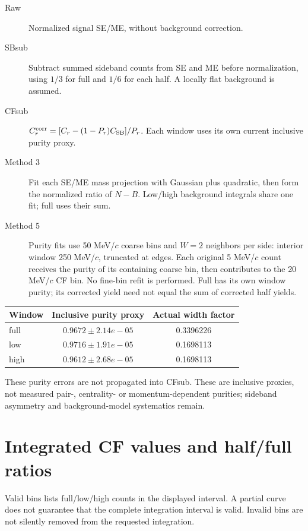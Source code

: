 \documentclass[10pt,a4paper]{article}
\begin{document}
\begin{description}
\item[Raw] Normalized signal SE/ME, without background correction.
\item[SBsub] Subtract summed sideband counts from SE and ME before normalization, using $1/3$ for full and $1/6$ for each half. A locally flat background is assumed.
\item[CFsub] $C_r^{\rm corr}=[C_r-(1-P_r)C_{\rm SB}]/P_r$. Each window uses its own current inclusive purity proxy.
\item[Method 3] Fit each SE/ME mass projection with Gaussian plus quadratic, then form the normalized ratio of $N-B$. Low/high background integrals share one fit; full uses their sum.
\item[Method 5] Purity fits use 50 MeV/$c$ coarse bins and $W=2$ neighbors per side: interior window 250 MeV/$c$, truncated at edges. Each original 5 MeV/$c$ count receives the purity of its containing coarse bin, then contributes to the 20 MeV/$c$ CF bin. No fine-bin refit is performed. Full has its own window purity; its corrected yield need not equal the sum of corrected half yields.
\end{description}
\begin{center}\begin{tabular}{lcc}\hline Window & Inclusive purity proxy & Actual width factor\\\hline
full & $0.9672\pm2.14e-05$ & 0.3396226\\
low & $0.9716\pm1.91e-05$ & 0.1698113\\
high & $0.9612\pm2.68e-05$ & 0.1698113\\
\hline\end{tabular}\end{center}
These purity errors are not propagated into CFsub. These are inclusive proxies, not measured pair-, centrality- or momentum-dependent purities; sideband asymmetry and background-model systematics remain.
\clearpage\section{Integrated CF values and half/full ratios}
Valid bins lists full/low/high counts in the displayed interval. A partial curve does not guarantee that the complete integration interval is valid. Invalid bins are not silently removed from the requested integration.
\end{document}
